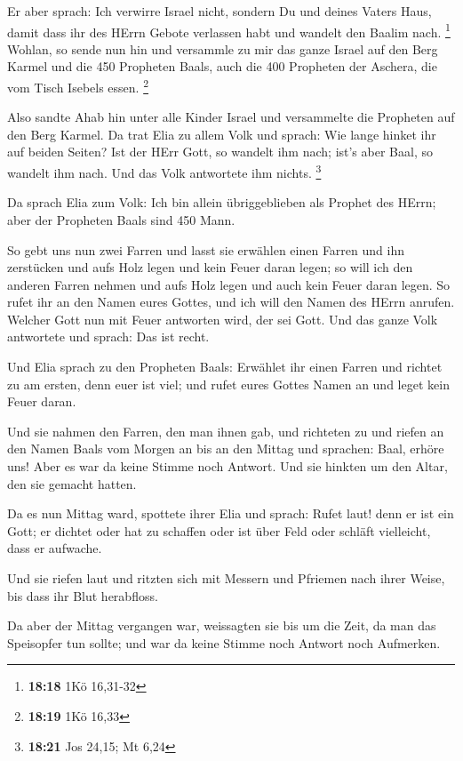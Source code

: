  Er aber sprach: Ich verwirre Israel nicht, sondern Du und
deines Vaters Haus, damit dass ihr des HErrn Gebote verlassen habt und
wandelt den Baalim nach. \footnote{\textbf{18:18} 1Kö 16,31-32}
 Wohlan, so sende nun hin und versammle zu mir das ganze
Israel auf den Berg Karmel und die 450 Propheten Baals, auch die 400
Propheten der Aschera, die vom Tisch Isebels essen. \footnote{\textbf{18:19}
  1Kö 16,33}

 Also sandte Ahab hin unter alle Kinder Israel und
versammelte die Propheten auf den Berg Karmel.  Da trat
Elia zu allem Volk und sprach: Wie lange hinket ihr auf beiden Seiten?
Ist der HErr Gott, so wandelt ihm nach; ist's aber Baal, so wandelt ihm
nach. Und das Volk antwortete ihm nichts. \footnote{\textbf{18:21} Jos
  24,15; Mt 6,24}

 Da sprach Elia zum Volk: Ich bin allein übriggeblieben als
Prophet des HErrn; aber der Propheten Baals sind 450 Mann.

 So gebt uns nun zwei Farren und lasst sie erwählen einen
Farren und ihn zerstücken und aufs Holz legen und kein Feuer daran
legen; so will ich den anderen Farren nehmen und aufs Holz legen und
auch kein Feuer daran legen.  So rufet ihr an den Namen
eures Gottes, und ich will den Namen des HErrn anrufen. Welcher Gott nun
mit Feuer antworten wird, der sei Gott. Und das ganze Volk antwortete
und sprach: Das ist recht.

 Und Elia sprach zu den Propheten Baals: Erwählet ihr einen
Farren und richtet zu am ersten, denn euer ist viel; und rufet eures
Gottes Namen an und leget kein Feuer daran.

 Und sie nahmen den Farren, den man ihnen gab, und
richteten zu und riefen an den Namen Baals vom Morgen an bis an den
Mittag und sprachen: Baal, erhöre uns! Aber es war da keine Stimme noch
Antwort. Und sie hinkten um den Altar, den sie gemacht hatten.

 Da es nun Mittag ward, spottete ihrer Elia und sprach:
Rufet laut! denn er ist ein Gott; er dichtet oder hat zu schaffen oder
ist über Feld oder schläft vielleicht, dass er aufwache.

 Und sie riefen laut und ritzten sich mit Messern und
Pfriemen nach ihrer Weise, bis dass ihr Blut herabfloss.

 Da aber der Mittag vergangen war, weissagten sie bis um
die Zeit, da man das Speisopfer tun sollte; und war da keine Stimme noch
Antwort noch Aufmerken.

